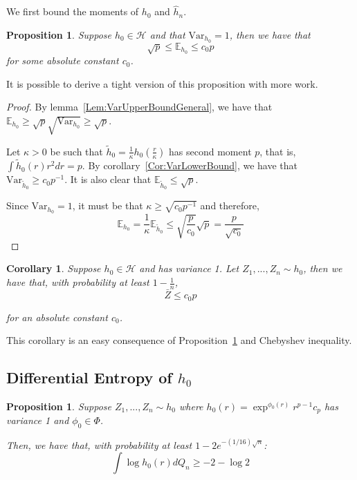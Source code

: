 \documentclass[12pt]{article}
\newtheorem{proposition}[theorem]{Proposition}
\newtheorem{corollary}[theorem]{Corollary}
\begin{document}
We first bound the moments of $h_0$ and $\hat{h}_n$.

\begin{proposition}
  \label{Prop:PopulationMeanBound}
  Suppose $h_0 \in \mathcal{H}$ and that $\textrm{Var}_{h_0} = 1$, then we have that
  \[
    \sqrt{p} \leq \mathbb{E}_{h_0} \leq c_0 p
  \]
  for some absolute constant $c_0$.
\end{proposition}
It is possible to derive a tight version of this proposition with more work.

\begin{proof}

  By lemma~\ref{Lem:VarUpperBoundGeneral}, we have that $\mathbb{E}_{h_0} \geq \sqrt{p} \sqrt{\textrm{Var}_{h_0}} \geq \sqrt{p}$. 

  Let $\kappa > 0$ be such that $\tilde{h}_{0} = \frac{1}{\kappa} h_0\left( \frac{r}{\kappa} \right)$ has second moment $p$, that is, $\int \tilde{h}_0(r) r^2 dr = p$.
  By corollary~\ref{Cor:VarLowerBound}, we have that $\textrm{Var}_{\tilde{h}_0} \geq c_0 p^{-1}$. It is also clear that $\mathbb{E}_{\tilde{h}_0} \leq \sqrt{p}$.

  Since $\textrm{Var}_{h_0} = 1$, it must be that $\kappa \geq \sqrt{c_0 p^{-1}}$ and therefore,
  \[
    \mathbb{E}_{h_0} = \frac{1}{\kappa} \mathbb{E}_{\tilde{h}_0} \leq \sqrt{\frac{p}{c_0}} \sqrt{p} = \frac{p}{\sqrt{c_0}}
  \]

\end{proof}

\begin{corollary}
  \label{Cor:EmpiricalMeanBound}
  Suppose $h_0 \in \mathcal{H}$ and has variance 1. Let $Z_1,...,Z_n \sim h_0$, then we have that, with probability at least $1 - \frac{1}{n}$,
  \[
    \bar{Z} \leq c_0 p
  \]

  for an absolute constant $c_0$.
\end{corollary}

This corollary is an easy consequence of Proposition~\ref{Prop:PopulationMeanBound} and Chebyshev inequality. 




\subsection{Differential Entropy of $h_0$}


\begin{proposition}
  \label{prop:loglikelihood_bound}
Suppose $Z_1,..., Z_n \sim h_0$ where $h_0(r) = \exp^{\phi_0(r)} r^{p-1} c_p$ has variance 1 and $\phi_0 \in \Phi$.

  Then, we have that, with probability at least $1 - 2 e^{-(1/16) \sqrt{n}}$:
  \[
    \int \log h_0(r)  d Q_n \geq -2 - \log 2
  \]
\end{proposition}
\end{document}
